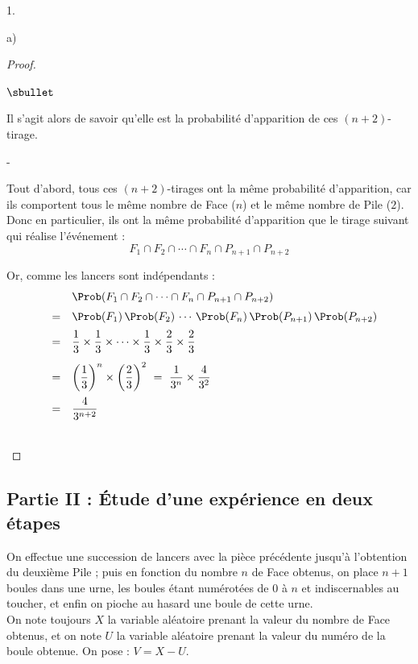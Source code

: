 \documentclass[11pt]{article}%
\begin{document}
\begin{noliste}{1.}
\begin{noliste}{a)}
\begin{proof}
\begin{noliste}{$\sbullet$}
	\item Il s'agit alors de savoir qu'elle est la probabilité 
	d'apparition de ces $(n+2)$-tirage.
	\begin{noliste}{-}
	  \item Tout d'abord, tous ces $(n+2)$-tirages ont la même 
	  probabilité d'apparition, car ils comportent tous le 
	  même nombre de Face ($n$) et le même nombre de Pile ($2$).\\
	  Donc en particulier, ils ont la même probabilité
	  d'apparition que le
	  tirage suivant qui réalise l'événement :
	  \[
	    F_1 \cap F_2 \cap \cdots \cap F_n \cap P_{n+1} \cap 
	    P_{n+2}
	  \]
	  
	  
	  
	  
	  \item Or, comme les lancers sont indépendants :
	  \[
	    \begin{array}{rcl}
	      & &\Prob(F_1 \cap F_2 \cap \cdots \cap F_n \cap P_{n+1} 
	      \cap P_{n+2})
	      \\[.2cm]
	      & = &  \Prob(F_1) \, \Prob(F_2) \, \cdots \, \Prob(F_n) \, 
	      \Prob(P_{n+1}) \, \Prob(P_{n+2})
	      \\[.2cm]
	      & = &  \dfrac{1}{3} \times \dfrac{1}{3} \times \cdots \times 
	      \dfrac{1}{3} \times \dfrac{2}{3} \times \dfrac{2}{3}
	      \\[.4cm]
	      & = &  \left(\dfrac{1}{3}\right)^n \times \left(
	      \dfrac{2}{3}\right)^2 
	      \ = \ \dfrac{1}{3^n} \times \dfrac{4}{3^2}
	      \\[.4cm]
	      & = &  \dfrac{4}{3^{n+2}}
	    \end{array}
	  \]
	\end{noliste}
      \end{noliste}
      
      ~\\[-1.4cm]
    \end{proof}
  \end{noliste}
\end{noliste}



\subsection*{Partie II : Étude d'une expérience en deux étapes}

\noindent
On effectue une succession de lancers avec la pièce précédente jusqu'à 
l'obtention du deuxième Pile ; puis en fonction du nombre $n$ de Face 
obtenus, on place $n+1$ boules dans une urne, les boules étant 
numérotées de $0$ à $n$ et indiscernables au toucher, et enfin on 
pioche au hasard une boule de cette urne.\\[.1cm]
On note toujours $X$ la variable aléatoire prenant la valeur du nombre 
de Face obtenus, et on note $U$ la variable aléatoire prenant la valeur 
du numéro de la boule obtenue. On pose : $V=X-U$.
\end{document}
